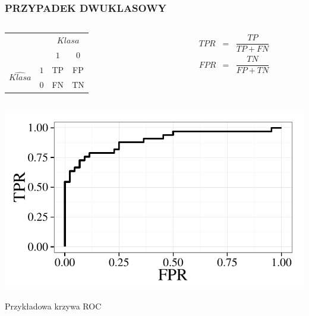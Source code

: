 \documentclass[11pt,usenames,dvipsnames,svgnames,x11names]{beamer}
\theoremstyle{plain}
\theoremstyle{definition}
\theoremstyle{remark}
\begin{document}
\begin{frame}
\frametitle{PRZYPADEK DWUKLASOWY}
\vspace{2mm}
\begin{columns}
\centering
	\begin{column}[c]{0.5\textwidth}
		\begin{tabular}{cc|cc} 
			& & \multicolumn{2}{c}{$Klasa$}\\ 
			& & $1$ & $0$ \\
			\hline
			\multirow{2}{*}{$\widehat{Klasa} $}
			& $1$ & TP & FP\\
			& $0$ & FN & TN
		\end{tabular}
	\end{column}
	\begin{column}[c]{0.5\textwidth}		
		\begin{eqnarray*}
		TPR&=&\dfrac{TP}{TP+FN}\\
		FPR&=&\dfrac{TN}{FP+TN}		
		\end{eqnarray*}
	\end{column}
\end{columns}	
\centering

\begin{table}[h]
\includegraphics[scale=0.6]{roc3.pdf}
\caption{Przykładowa krzywa ROC}
\end{table}

\end{frame}
\end{document}
